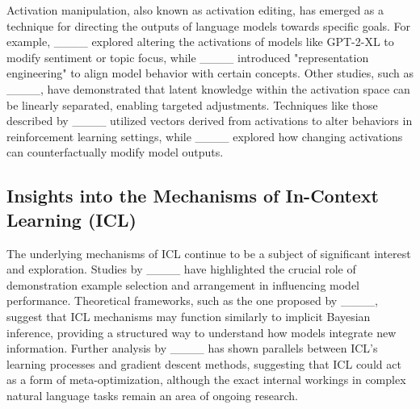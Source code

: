 Activation manipulation, also known as activation editing, has emerged as a technique for directing the outputs of language models towards specific goals. For example, ____ explored altering the activations of models like GPT-2-XL to modify sentiment or topic focus, while ____ introduced "representation engineering" to align model behavior with certain concepts. Other studies, such as ____, have demonstrated that latent knowledge within the activation space can be linearly separated, enabling targeted adjustments. Techniques like those described by ____ utilized vectors derived from activations to alter behaviors in reinforcement learning settings, while ____ explored how changing activations can counterfactually modify model outputs.

\subsection{Insights into the Mechanisms of In-Context Learning (ICL)}

The underlying mechanisms of ICL continue to be a subject of significant interest and exploration. Studies by ____ have highlighted the crucial role of demonstration example selection and arrangement in influencing model performance. Theoretical frameworks, such as the one proposed by ____, suggest that ICL mechanisms may function similarly to implicit Bayesian inference, providing a structured way to understand how models integrate new information. Further analysis by ____ has shown parallels between ICL's learning processes and gradient descent methods, suggesting that ICL could act as a form of meta-optimization, although the exact internal workings in complex natural language tasks remain an area of ongoing research.